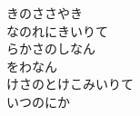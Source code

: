 \documentclass[10pt,b5j]{tarticle} %
\begin{document}
\begin{enumerate}
\begin{minipage}[c]{\blocksize}
        \vspace{\linespace}
        \item
        きのささやき\\
        なのれにきいりて\\
        らかさのしなん\\
        をわなん\\
        けさのとけこみいりて\\
        いつのにか
    
    \end{minipage}
\end{enumerate} %
\end{document}
